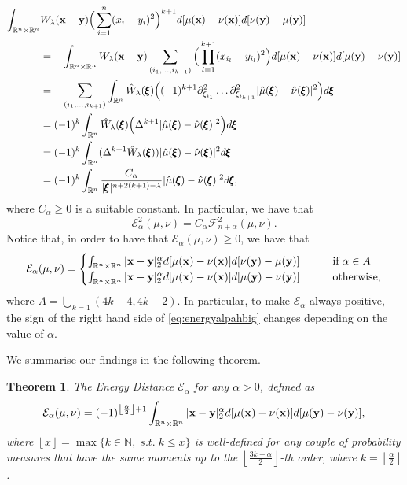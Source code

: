 \documentclass{article}
\renewcommand{\le}{\leqslant}
\renewcommand{\ge}{\geqslant}
\newcommand{\R}{\mathbb R}
\newcommand{\N}{\mathbb N}
\newcommand{\floor}[1]{\left\lfloor #1 \right\rfloor}
\def\N{\mathbb{N}}
\def\R{\mathbb{R}}
\def\bx{{\bf x}}
\def\by{{\bf y}}
\def\bxi{{\pmb\xi}}
\def \erre{\mathbb{R}}
\newtheorem{theorem}{Theorem}
\begin{document}
\begin{align*}
    \int_{\R^n\times\R^n}&W_\lambda(\bx-\by)\Big(\sum_{i=1}^n(x_i-y_i)^2\Big)^{k+1}d[\mu(\bx)-\nu(\bx)]d[\nu(\by)-\mu(\by)]\\
    &=-\int_{\R^n\times\R^n} W_\lambda(\bx-\by)\sum_{(i_1,\dots,i_{k+1})} \Big(\prod_{l=1}^{k+1}(x_{i_l}-y_{i_l})^2\Big)d[\mu(\bx)-\nu(\bx)]d[\mu(\by)-\nu(\by)]\\
    &=-\sum_{(i_1,\dots,i_{k+1})}\int_{\R^n}\hat W_\lambda(\bxi) \Big((-1)^{k+1}\partial^2_{\xi_{i_1}}\dots\partial_{\xi_{i_{k+1}}}^2 |\hat\mu(\bxi)-\hat\nu(\bxi)|^2\Big)d\bxi\\
    &=(-1)^{k}\int_{\R^n}\hat W_\lambda(\bxi)\Big(\Delta^{k+1} |\hat\mu(\bxi)-\hat\nu(\bxi)|^2\Big)d\bxi\\
    &=(-1)^{k}\int_{\R^n}(\Delta^{k+1}\hat W_\lambda(\bxi))|\hat\mu(\bxi)-\hat\nu(\bxi)|^2d\bxi\\
    &=(-1)^{k}\int_{\R^n}\frac{C_\alpha}{|\bxi|^{n+2(k+1)-\lambda}}|\hat\mu(\bxi)-\hat\nu(\bxi)|^2d\bxi,
\end{align*}
where $C_\alpha\ge 0$ is a suitable constant.
% 
In particular, we have that
% 
\begin{equation}
    \mathcal{E}^2_\alpha(\mu,\nu)=C_\alpha\mathcal{F}^2_{n+\alpha}(\mu,\nu).
\end{equation}
% 
Notice that, in order to have that $\mathcal{E}_\alpha(\mu,\nu)\ge 0$, we have that
\begin{equation}
    \mathcal{E}_\alpha(\mu,\nu)=\begin{cases}
        \int_{\erre^n\times\erre^n}|\bx-\by|^\alpha_2d[\mu(\bx)-\nu(\bx)]d[\nu(\by)-\mu(\by)]\quad\quad&\text{if}\;\alpha\in A\\
        \int_{\erre^n\times\erre^n}|\bx-\by|^\alpha_2d[\mu(\bx)-\nu(\bx)]d[\mu(\by)-\nu(\by)]\quad\quad&\text{otherwise},
    \end{cases}
\end{equation}
where $A=\bigcup_{k=1}(4k-4,4k-2)$.
% 
In particular, to make $\mathcal{E}_\alpha$ always positive, the sign of the right hand side of \eqref{eq:energyalpahbig} changes depending on the value of $\alpha$.
% 

We summarise our findings in the following theorem.

\begin{theorem}
    The Energy Distance $\mathcal{E}_\alpha$ for any $\alpha>0$, defined as
    \begin{equation}
        \mathcal{E}_\alpha(\mu,\nu)=(-1)^{\floor{\frac{\alpha}{2}}+1}\int_{\erre^n\times\erre^n}|\bx-\by|_2^\alpha d[\mu(\bx)-\nu(\bx)]d[\mu(\by)-\nu(\by)],
    \end{equation}
    where $\floor{x}=\max\{k\in\N,\;s.t.\;k\le x\}$ is well-defined for any couple of probability measures that have the same moments up to the $\floor{\frac{3k-\alpha}{2}}$-th order, where $k=\floor{\frac{\alpha}{2}}$.
\end{theorem}
\end{document}
